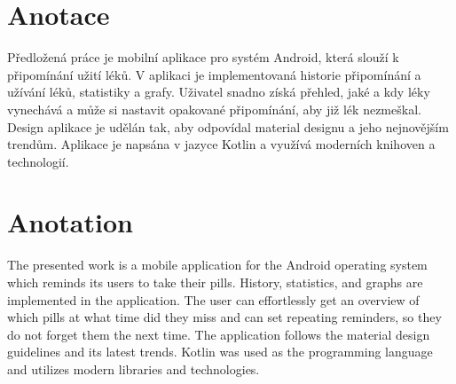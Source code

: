\documentclass[../TakeYourPill.tex]{subfiles}
\begin{document}
\newpage
\section*{Anotace}
Předložená práce je mobilní aplikace pro systém Android, která slouží k připomínání užití léků. V aplikaci je implementovaná historie připomínání a užívání léků, statistiky a grafy. Uživatel snadno získá přehled, jaké a kdy léky vynechává a může si nastavit opakované připomínání, aby již lék nezmeškal. Design aplikace je udělán tak, aby odpovídal material designu a jeho nejnovějším trendům. Aplikace je napsána v jazyce Kotlin a využívá moderních knihoven a technologií.
\vspace*{\fill}
\section*{Anotation}
The presented work is a mobile application for the Android operating system which reminds its users to take their pills. History, statistics, and graphs are implemented in the application. The user can effortlessly get an overview of which pills at what time did they miss and can set repeating reminders, so they do not forget them the next time. The application follows the material design guidelines and its latest trends. Kotlin was used as the programming language and utilizes modern libraries and technologies.
\end{document}
